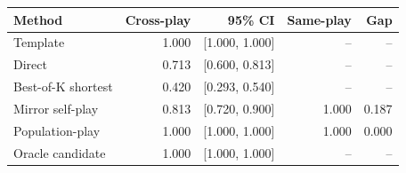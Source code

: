 \begin{tabular}{lrrrr}
\toprule
Method & Cross-play & 95\% CI & Same-play & Gap \\
\midrule
Template & 1.000 & [1.000, 1.000] & -- & -- \\
Direct & 0.713 & [0.600, 0.813] & -- & -- \\
Best-of-K shortest & 0.420 & [0.293, 0.540] & -- & -- \\
Mirror self-play & 0.813 & [0.720, 0.900] & 1.000 & 0.187 \\
Population-play & 1.000 & [1.000, 1.000] & 1.000 & 0.000 \\
Oracle candidate & 1.000 & [1.000, 1.000] & -- & -- \\
\bottomrule
\end{tabular}

